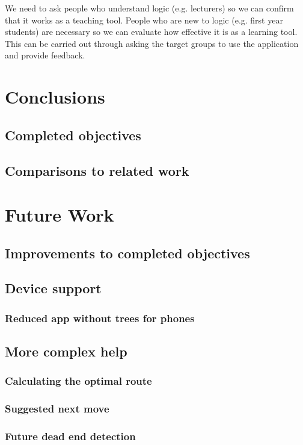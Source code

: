 \documentclass{report}
\begin{document}
We need to ask people who understand logic (e.g. lecturers) so we can confirm that it works as a teaching tool. People who are new to logic (e.g. first year students) are necessary so we can evaluate how effective it is as a learning tool. This can be carried out through asking the target groups to use the application and provide feedback.

\chapter{Conclusions}
\section{Completed objectives}
\section{Comparisons to related work}

\chapter{Future Work}
\section{Improvements to completed objectives}

\section{Device support}
\subsection{Reduced app without trees for phones}

\section{More complex help}
\subsection{Calculating the optimal route}
\subsection{Suggested next move}
\subsection{Future dead end detection}
\end{document}
